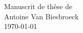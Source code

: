 \documentclass[a4paper]{book}
\renewcommand{\familydefault}{\sfdefault}
\begin{document}
% 

\normalsize
\renewcommand{\familydefault}{\rmdefault}
\normalfont


\ \vfill
\begin{center}
	\LARGE
	\textbf{\PhDTitleEN}\\[1em]

	\Large
	Manuscrit de thèse de\\
	Antoine Van Biesbroeck\\

	\today
\end{center}
\vfill
\normalsize

\noindent

\end{document}
